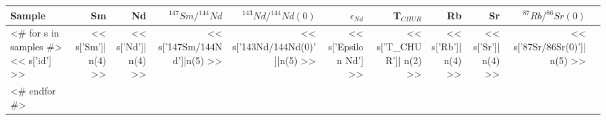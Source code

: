 \begin{tabular}{l r r r r r r r r r r}
\toprule
 Sample & Sm & Nd &
  ${^{147}Sm}/{^{144}Nd}$ &
  ${^{143}Nd}/{^{144}Nd}(0)$ &
$\epsilon_{Nd}$ & T$_{CHUR}$ &
  Rb & Sr &
  ${^{87}Rb}/{^{86}Sr}(0)$ \\
\midrule
<# for s in samples  #>
  << s['id'] >> &
  << s['Sm']| n(4) >> &
  << s['Nd']|n(4) >> &
  << s['147Sm/144Nd']|n(5) >> &
  << s['143Nd/144Nd(0)']|n(5) >> &
  << s['Epsilon Nd'] >> &
  << s['T_CHUR']| n(2) >> &
  << s['Rb']|n(4) >> &
  << s['Sr']|n(4) >> &
  << s['87Sr/86Sr(0)']|n(5) >> \\
<# endfor  #>

\bottomrule
\end{tabular}

